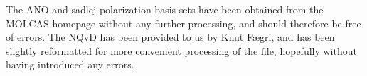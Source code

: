 The ANO and sadlej polarization basis sets have been obtained from the
MOLCAS homepage without any further processing, and should therefore
be free of errors. The NQvD has been provided to us by Knut F\ae gri,
and has been slightly reformatted for more convenient processing of
the file, hopefully without having introduced any errors.



